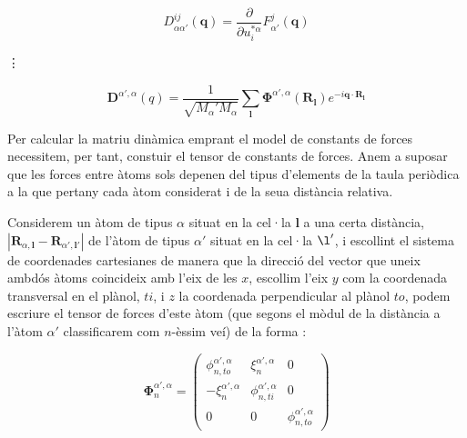 \documentclass[12pt]{article} %
\let\vec\mathbf %
\begin{document}
\begin{equation}
D_{\alpha\alpha\prime}^{ij}(\vec q)=\frac{\partial}{\partial u^{*\alpha}_{i}}F^{j}_{\alpha'}(\vec q)
\end{equation}

\vdots

\begin{equation}
 \label{eq:matriu_dinàmica}
 \boxed{
 \vec D^{\alpha',\alpha}(q)=\frac{1}{\sqrt{M_\alpha' M_{\alpha}}}\sum_\vec l\vec\Phi^{\alpha',\alpha}\left(\vec R_\vec l\right)e^{-i\vec q\cdot\vec R_\vec l}}
\end{equation}




Per calcular la matriu dinàmica emprant el model de constants de forces necessitem, per tant, constuir el tensor de constants de forces. Anem a suposar que les forces entre àtoms sols depenen del tipus d'elements de la taula periòdica a la que pertany cada àtom considerat i de la seua distància relativa.

Considerem un àtom de tipus $\alpha$ situat en la cel·la $\vec l$ a una certa distància, $|\vec R_{\alpha,\vec l}-\vec R_{\alpha',\vec{l'}}|$ de l'àtom de tipus $\alpha'$  situat en la cel·la $\l'$, i escollint el sistema de coordenades cartesianes de manera que la direcció del vector que uneix ambdós àtoms coincideix amb l'eix de les $x$, escollim l'eix $y$ com la coordenada transversal en el plànol, $ti$, i $z$ la coordenada perpendicular al plànol $to$, podem escriure el tensor de forces d'este àtom (que segons el mòdul de la distància a l'àtom $\alpha'$ classificarem com $n$-èssim veí) de la forma \cite{wirtz04_phonon_disper_graph_revis}:


\begin{equation}
\vec\Phi_n^{\alpha',\alpha}=\begin{pmatrix}
\phi_{n,to}^{\alpha',\alpha}&\xi_n^{\alpha',\alpha} &0\\
-\xi_n^{\alpha',\alpha} & \phi_{n,ti}^{\alpha',\alpha} & 0 \\
0 & 0 & \phi_{n,to}^{\alpha',\alpha}
\end{pmatrix}
\label{eq:tensordeforces}
\end{equation}
\end{document}
